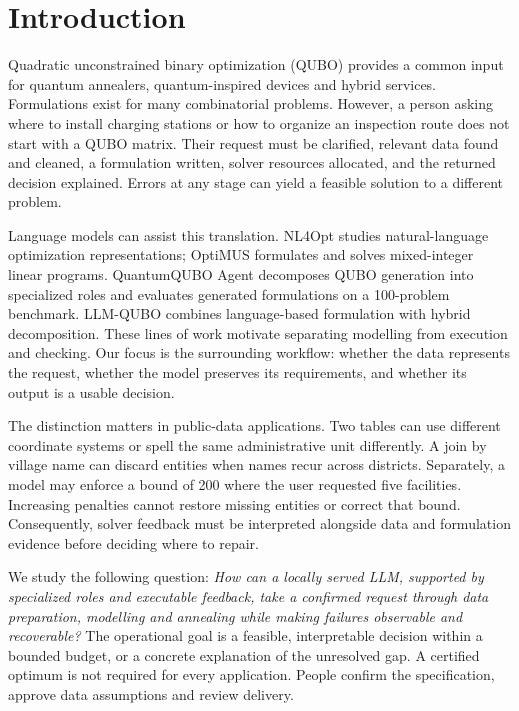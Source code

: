 \section{Introduction}
Quadratic unconstrained binary optimization (QUBO) provides a common input for quantum annealers,
quantum-inspired devices and hybrid services. Formulations exist for many combinatorial problems\cite{lucas2014ising}.
However, a person asking where to install charging stations or how to organize an inspection route does not
start with a QUBO matrix. Their request must be clarified, relevant data found and cleaned, a formulation
written, solver resources allocated, and the returned decision explained. Errors at any stage can yield a
feasible solution to a different problem.

Language models can assist this translation. NL4Opt studies natural-language optimization
representations\cite{ramamonjison2023nl4opt}; OptiMUS formulates and solves mixed-integer linear
programs\cite{ahmaditeshnizi2024optimus}. QuantumQUBO Agent decomposes QUBO generation into specialized roles
and evaluates generated formulations on a 100-problem benchmark\cite{mondal2026quantumqubo}.
LLM-QUBO combines language-based formulation with hybrid decomposition\cite{llmqubo2025}.
These lines of work motivate separating modelling from execution and checking. Our focus is the surrounding
workflow: whether the data represents the request, whether the model preserves its requirements, and whether
its output is a usable decision.

The distinction matters in public-data applications. Two tables can use different coordinate systems or spell
the same administrative unit differently. A join by village name can discard entities when names recur across
districts. Separately, a model may enforce a bound of 200 where the user requested five facilities.
Increasing penalties cannot restore missing entities or correct that bound. Consequently, solver feedback must
be interpreted alongside data and formulation evidence before deciding where to repair.

We study the following question: \emph{How can a locally served LLM, supported by specialized roles and executable
feedback, take a confirmed request through data preparation, modelling and annealing while making failures
observable and recoverable?} The operational goal is a feasible, interpretable decision within a bounded budget,
or a concrete explanation of the unresolved gap. A certified optimum is not required for every application.
People confirm the specification, approve data assumptions and review delivery.

